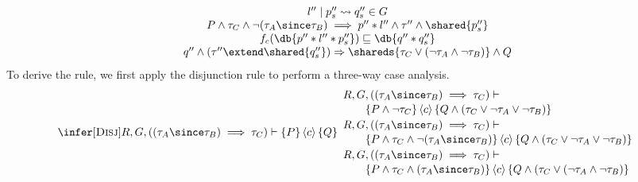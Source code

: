 \[\begin{array}{c}
{\begin{array}{c}
l'' \mid p''_s \leadsto q''_s \in G
\\
P \wedge \tau_C \wedge \neg (\tau_A \since \tau_B) \implies  p'' * l'' \wedge \tau'' \wedge \shared{p''_s}
\\
f_c(\db{p'' * l'' * p''_s}) \sqsubseteq \db{q'' * q''_s}
\\
q'' \wedge (\tau'' \extend \shared{q''_s})
\Rightarrow  
\shareds{\tau_C \lor (\neg \tau_A \land \neg \tau_B)} \land Q
\end{array}
}
%  
\end{array}
\]
To derive the rule, we first apply the disjunction rule to 
perform a three-way case analysis.
\[
\begin{array}{c}
%
\infer[\textsc{Disj}]{
R, G, ((\tau_A \since \tau_B) \implies \tau_C) \vdash 
\{P \}
\, \langle c \rangle\, 
\{ Q \} %
}{
\begin{array}{l}  
R, G, ((\tau_A \since \tau_B) \implies \tau_C) \vdash \mbox{}\\[1pt]
\qquad
\{P\wedge \neg \tau_C\}
\, \langle c \rangle\, 
\{Q \wedge (\tau_C \lor \neg \tau_A \lor \neg \tau_B)\} %
\\[2pt]
R, G, ((\tau_A \since \tau_B) \implies \tau_C) \vdash \mbox{}\\[1pt]
\qquad
\{P\wedge \tau_C \wedge \neg (\tau_A \since \tau_B)\}
\, \langle c \rangle\, 
\{Q \wedge (\tau_C \lor \neg \tau_A \lor \neg \tau_B)\} %
\\[2pt]
R, G, ((\tau_A \since \tau_B) \implies \tau_C) \vdash \mbox{}\\[1pt]
\qquad
\{P\wedge \tau_C \wedge (\tau_A \since \tau_B)\}
\, \langle c \rangle\, 
\{Q \wedge (\tau_C \lor (\neg \tau_A \land \neg \tau_B)\} %
\end{array}
}
%  
\end{array}
\]

